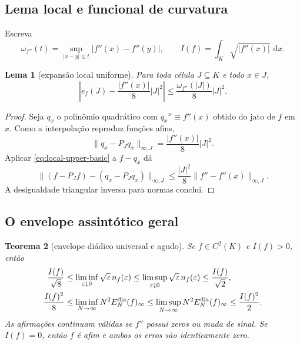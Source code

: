 \documentclass[11pt,a4paper]{article}
\newtheorem{theorem}{Teorema}[section]
\newtheorem{lemma}[theorem]{Lema}
\theoremstyle{definition}
\theoremstyle{remark}
\newcommand{\dd}{\,\mathrm{d}}
\begin{document}
\subsection{Lema local e funcional de curvatura}

Escreva
\[
 \omega_{f''}(t)=\sup_{|x-y|\le t}|f''(x)-f''(y)|,
 \qquad
 I(f)=\int_K\sqrt{|f''(x)|}\,\dd x.
\]

\begin{lemma}[expansão local uniforme]
\label{lem:local-asymptotic-error}
Para toda célula $J\subseteq K$ e todo $x\in J$,
\begin{equation}
 \left|e_f(J)-\frac{|f''(x)|}{8}|J|^2\right|
 \le \frac{\omega_{f''}(|J|)}{8}|J|^2.
 \label{eq:local-asymptotic-error}
\end{equation}
\end{lemma}

\begin{proof}
Seja $q_x$ o polinômio quadrático com $q_x''\equiv f''(x)$ obtido do jato de
$f$ em $x$. Como a interpolação reproduz funções afins,
\[
 \|q_x-P_Jq_x\|_{\infty,J}=\frac{|f''(x)|}{8}|J|^2.
\]
Aplicar \eqref{eq:local-upper-basic} a $f-q_x$ dá
\[
 \|(f-P_Jf)-(q_x-P_Jq_x)\|_{\infty,J}
 \le\frac{|J|^2}{8}\|f''-f''(x)\|_{\infty,J}.
\]
A desigualdade triangular inversa para normas conclui.
\end{proof}

\subsection{O envelope assintótico geral}

\begin{theorem}[envelope diádico universal e agudo]
\label{thm:general-dyadic-envelope}
Se $f\in C^2(K)$ e $I(f)>0$, então
\begin{align}
 \frac{I(f)}{\sqrt8}
 &\le \liminf_{\varepsilon\downarrow0}
       \sqrt\varepsilon\,n_f(\varepsilon)
 \le \limsup_{\varepsilon\downarrow0}
       \sqrt\varepsilon\,n_f(\varepsilon)
 \le \frac{I(f)}{\sqrt2},
 \label{eq:threshold-envelope}\\
 \frac{I(f)^2}{8}
 &\le \liminf_{N\to\infty}N^2E_N^{\rm dia}(f)_\infty
 \le \limsup_{N\to\infty}N^2E_N^{\rm dia}(f)_\infty
 \le \frac{I(f)^2}{2}.
 \label{eq:budget-envelope}
\end{align}
As afirmações continuam válidas se $f''$ possui zeros ou muda de sinal. Se
$I(f)=0$, então $f$ é afim e ambos os erros são identicamente zero.
\end{theorem}
\end{document}
